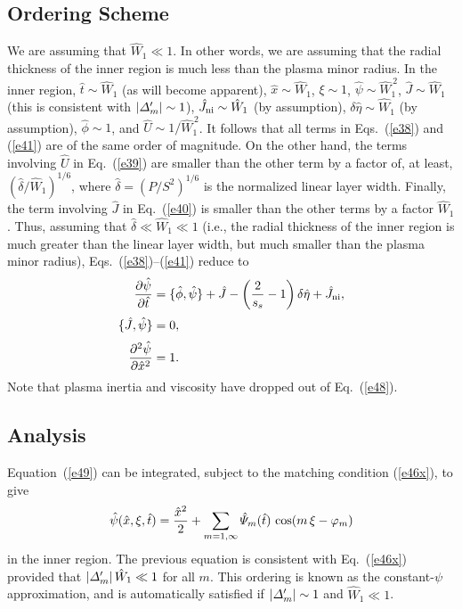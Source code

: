 \documentclass[12pt,prb,aps]{revtex4-1}
\begin{document}
\subsection{Ordering Scheme}
We are assuming that $\hat{W}_1\ll 1$. In other words, we are assuming that the radial thickness of the
inner region is much less than the plasma minor radius. In the inner region,
$\hat{t}\sim \hat{W}_1$ (as will become apparent), 
$\hat{x}\sim \hat{W}_1$, $\xi\sim 1$, $\hat{\psi}\sim \hat{W}_1^{\,2}$, $\hat{J}\sim \hat{W}_1$ (this is consistent with $|{\mit\Delta}_m'|\sim 1$), $\hat{J}_{\rm ni}\sim \hat{W}_1$ (by assumption), $\delta\hat{\eta}\sim \hat{W}_1$ (by assumption), $\hat{\phi}\sim 1$, and $\hat{U}\sim
1/\hat{W}_1^{\,2}$. 
It follows that all terms in Eqs.~(\ref{e38}) and (\ref{e41}) are of the same order of magnitude. On the
other hand, the terms involving $\hat{U}$ in Eq.~(\ref{e39}) are smaller than the other term by
a factor of, at least, $(\hat{\delta}/\hat{W}_1)^{1/6}$, where $\hat{\delta}= (P/S^2)^{1/6}$ is the normalized linear layer width.\cite{rf0} Finally, the term involving $\hat{J}$ in Eq.~(\ref{e40}) is smaller
than the other terms by a factor $\hat{W}_1$. 
Thus, assuming that $\hat{\delta}\ll \hat{W}_1\ll 1$
(i.e., the radial thickness of the inner region is much greater than the
linear layer width,  but much smaller than the
plasma minor radius), Eqs.~(\ref{e38})--(\ref{e41})
reduce to 
\begin{align}\label{e42x}
\frac{\partial\hat{\psi}}{\partial\hat{t}}&= \{\hat{\phi},\hat{\psi}\}+\hat{J} - \left(\frac{2}{s_s}-1\right)\delta\hat{\eta}
+ \hat{J}_{\rm ni},\\[0.5ex]
\{\hat{J},\hat{\psi}\} &=0,\label{e48}\\[0.5ex]
\frac{\partial^2\hat{\psi}}{\partial\hat{x}^2}&= 1.\label{e49}
\end{align}
Note that plasma inertia and viscosity have dropped
out of Eq.~(\ref{e48}). 

\subsection{Analysis}
Equation~(\ref{e49}) can be integrated, subject to the
matching condition (\ref{e46x}), to give
\begin{equation}\label{e41s}
\hat{\psi}(\hat{x},\xi,\hat{t})=\frac{\hat{x}^{2}}{2}+\sum_{m=1,\infty}\hat{\mit\Psi}_m(\hat{t})\,\cos(m\,\xi-\varphi_m)
\end{equation}
in the inner region. The previous equation is
consistent with Eq.~(\ref{e46x}) provided that
$|{\mit\Delta}_m'|\,\hat{W}_1\ll 1$ for all $m$. This
ordering is known as the constant-$\psi$ approximation,\cite{fkr} and is automatically
satisfied if $|{\mit\Delta}_m'|\sim 1$ and $\hat{W}_1\ll 1$. 
\end{document}
